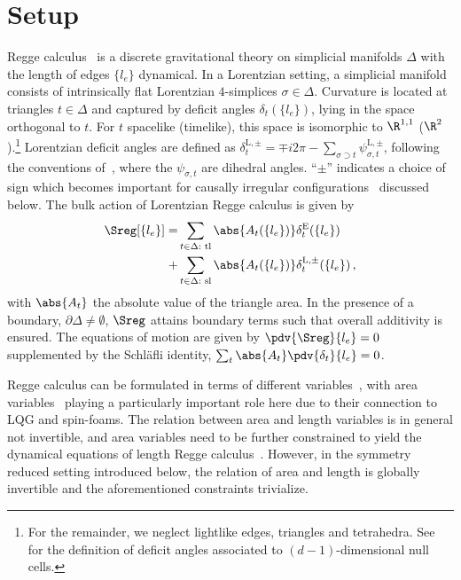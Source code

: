 \section{Setup}

Regge calculus~\cite{Regge:1961ct} is a discrete gravitational theory on simplicial manifolds $\Delta$ with the length of edges $\{l_e\}$ dynamical. In a Lorentzian setting, a simplicial manifold consists of intrinsically flat Lorentzian $4$-simplices $\sigma\in\Delta$. Curvature is located at triangles $t\in\Delta$ and captured by deficit angles $\delta_t(\{l_e\})$, lying in the space orthogonal to $t$. For $t$ spacelike (timelike), this space is isomorphic to $\R^{1,1}$ ($\R^2$).\footnote{For the remainder, we neglect lightlike edges, triangles and tetrahedra. See~\cite{Sorkin:2019llw} for the definition of deficit angles associated to $(d-1)$-dimensional null cells.} Lorentzian deficit angles are defined as $\delta_t^{\mathrm{L},\pm} = \mp i 2\pi  -\sum_{\sigma\supset t}\psi_{\sigma,t}^{\mathrm{L},\pm}$, following the conventions of~\cite{Sorkin:2019llw,Asante:2021zzh}, where the $\psi_{\sigma,t}$ are dihedral angles. \enquote{$\pm$} indicates a choice of sign which becomes important for causally irregular configurations~\cite{Sorkin:2019llw,Asante:2021zzh,Asante:2021phx} discussed below. The bulk action of Lorentzian Regge calculus is given by~\cite{Asante:2021zzh,Sorkin:2019llw,Regge:1961ct}
%
\begin{equation}\label{eq:general Regge action}
\begin{aligned}
\Sreg[\{l_e\}] =& \sum_{t\in\Delta:\text{ tl}}\abs{A_t(\{l_e\})}\delta_t^{\mathrm{E}}(\{l_e\})\\
+&\sum_{t\in\Delta:\text{ sl}}\abs{A_t(\{l_e\})}\delta_t^{\mathrm{L},\pm}(\{l_e\})\,,
\end{aligned}
\end{equation}
%
with $\abs{A_t}$ the absolute value of the triangle area. In the presence of a boundary, $\partial\Delta\neq\emptyset$, $\Sreg$ attains boundary terms such that overall additivity is ensured. The equations of motion are given by $\pdv{\Sreg}{l_e} = 0$ supplemented by the Schl\"{a}fli identity, $\sum_t \abs{A_t}\pdv{\delta_t}{l_e} = 0$. 

Regge calculus can be formulated in terms of different variables~\cite{Barrett:1994nn,Dittrich:2008va}, with area variables~\cite{Asante:2018wqy,Makela:2000ej,Barrett:1997tx} playing a particularly important role here due to their connection to LQG and spin-foams. The relation between area and length variables is in general not invertible, and area variables need to be further constrained to yield the dynamical equations of length Regge calculus~\cite{Barrett:1997tx,Dittrich:2008va,Asante:2021zzh}. However, in the symmetry reduced setting introduced below, the relation of area and length is globally invertible and the aforementioned constraints trivialize. 

